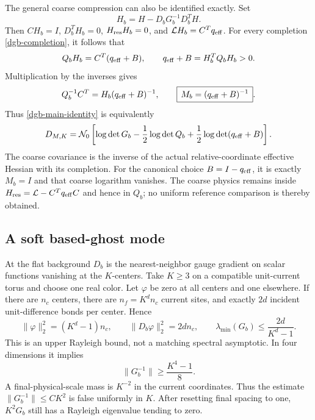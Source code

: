 The general coarse compression can also be identified
exactly. Set
\begin{equation}
                   H_b=H-D_bG_b^{-1}D_b^TH .
 \label{dgb-adjusted-lift}
\end{equation}
Then $CH_b=I$, $D_b^TH_b=0$, $H_{\rm res}H_b=0$, and
$\mathcal LH_b=C^Tq_{\rm eff}$. For every completion
\eqref{dgb-completion}, it follows that
\begin{equation}
 Q_bH_b=C^T(q_{\rm eff}+B),\qquad
 q_{\rm eff}+B=H_b^TQ_bH_b>0.
 \label{dgb-effective-Schur}
\end{equation}
Multiplication by the inverses gives
\begin{equation}
 Q_b^{-1}C^T=H_b(q_{\rm eff}+B)^{-1},\qquad
 \boxed{\,M_b=(q_{\rm eff}+B)^{-1}\,}.
 \label{dgb-coarse-identification}
\end{equation}
Thus \eqref{dgb-main-identity} is equivalently
\begin{equation}
 D_{M,K}=\mathcal N_0\left[
      \log\det G_b-\frac12\log\det Q_b
                   +\frac12\log\det(q_{\rm eff}+B)\right].
 \label{dgb-effective-determinant}
\end{equation}
The coarse covariance is the inverse of the actual
relative-coordinate effective Hessian with its completion.
For the canonical choice $B=I-q_{\rm eff}$, it is exactly
$M_b=I$ and that coarse logarithm vanishes. The coarse
physics remains inside
$H_{\rm res}=\mathcal L-C^Tq_{\rm eff}C$ and hence in $Q_b$;
no uniform reference comparison is thereby obtained.

\subsection{A soft based-ghost mode}
\label{dgb-soft-ghost-section}

At the flat background $D_b$ is the nearest-neighbor gauge
gradient on scalar functions vanishing at the $K$-centers.
Take $K\geq3$ on a compatible unit-current torus and choose
one real color. Let $\varphi$ be zero at all centers and
one elsewhere. If there are $n_c$ centers, there are
$n_f=K^dn_c$ current sites, and exactly $2d$ incident
unit-difference bonds per center. Hence
\begin{equation}
 \|\varphi\|_2^2=(K^d-1)n_c,\qquad
 \|D_b\varphi\|_2^2=2dn_c,\qquad
 \lambda_{\min}(G_b)\leq\frac{2d}{K^d-1}.
 \label{dgb-Rayleigh}
\end{equation}
This is an upper Rayleigh bound, not a matching spectral
asymptotic. In four dimensions it implies
\[
                         \|G_b^{-1}\|\geq\frac{K^4-1}{8}.
\]
A final-physical-scale mass is $K^{-2}$ in the current
coordinates. Thus the estimate $\|G_b^{-1}\|\leq CK^2$
is false uniformly in $K$. After resetting final spacing
to one, $K^2G_b$ still has a Rayleigh eigenvalue tending
to zero.

